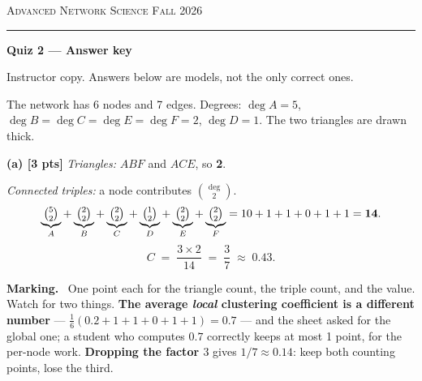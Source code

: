 \documentclass[a4paper, 12pt]{extarticle}
\newenvironment{grading}
  {\begin{tcolorbox}[colback=pltblue!4, colframe=pltblue!35, boxrule=0.5pt,
                     sharp corners, boxsep=2pt, left=6pt, right=6pt,
                     top=4pt, bottom=4pt]\footnotesize\textbf{Marking.}\ }
  {\end{tcolorbox}}
\begin{document}
{\footnotesize\textsc{Advanced Network Science} \hfill \textsc{Fall 2026}}\par
\vspace{-0.2em}\rule{\textwidth}{1pt}\par
\vspace{0.3em}
{\LARGE\bfseries Quiz 2 \; --- \; Answer key}\par
\vspace{0.1em}
{\small Instructor copy. Answers below are models, not the only correct ones.}\par
\vspace{0.8em}


The network has 6 nodes and 7 edges. Degrees:
$\deg A = 5$, $\deg B = \deg C = \deg E = \deg F = 2$, $\deg D = 1$.
The two triangles are drawn thick.

\begin{center}
\end{center}

\textbf{(a) [3 pts]} \emph{Triangles:} $ABF$ and $ACE$, so \textbf{2}.

\emph{Connected triples:} a node contributes $\binom{\deg}{2}$.
\[
  \underbrace{\tbinom{5}{2}}_{A} + \underbrace{\tbinom{2}{2}}_{B}
  + \underbrace{\tbinom{2}{2}}_{C} + \underbrace{\tbinom{1}{2}}_{D}
  + \underbrace{\tbinom{2}{2}}_{E} + \underbrace{\tbinom{2}{2}}_{F}
  = 10 + 1 + 1 + 0 + 1 + 1 = \mathbf{14}.
\]
\[
  C \;=\; \frac{3 \times 2}{14} \;=\; \frac{3}{7} \;\approx\; \mathbf{0.43}.
\]

\begin{grading}
One point each for the triangle count, the triple count, and the value.
Watch for two things. \textbf{The average \emph{local} clustering coefficient
is a different number} --- $\frac{1}{6}(0.2 + 1 + 1 + 0 + 1 + 1) = 0.7$ --- and
the sheet asked for the global one; a student who computes $0.7$ correctly
keeps at most 1 point, for the per-node work. \textbf{Dropping the factor $3$}
gives $1/7 \approx 0.14$: keep both counting points, lose the third.
\end{grading}
\end{document}
